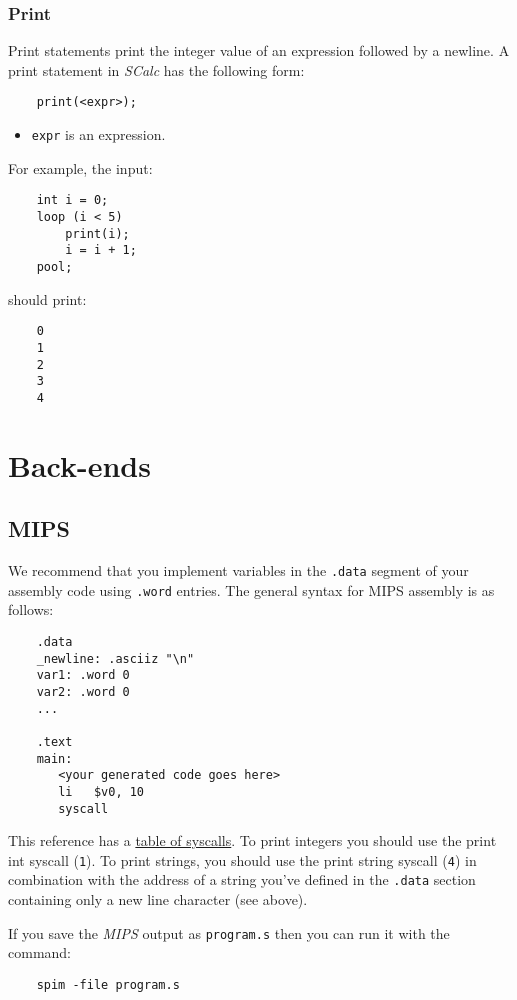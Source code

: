 \documentclass{article}
\newcommand{\code}[1]{\texttt{\textmd{#1}}}
\begin{document}
\subsubsection{Print}
\label{sssec:print}
Print statements print the integer value of an expression followed by a newline. A print statement
in \textit{SCalc} has the following form:
\begin{lstlisting}
	print(<expr>);
\end{lstlisting}

\begin{itemize}
	\item \code{expr} is an expression.
\end{itemize}

For example, the input:
\begin{lstlisting}
	int i = 0;
	loop (i < 5)
		print(i);
		i = i + 1;
	pool;
\end{lstlisting}
should print:
\begin{lstlisting}
	0
	1
	2
	3
	4
\end{lstlisting}

\section{Back-ends}
\subsection{MIPS}
We recommend that you implement variables in the \code{.data} segment of your assembly code using \code{.word} entries. The
general syntax for MIPS assembly is as follows:

\begin{lstlisting}
	.data
	_newline: .asciiz "\n"
	var1: .word 0
	var2: .word 0
	...

	.text
	main:
	   <your generated code goes here>
	   li   $v0, 10
	   syscall
\end{lstlisting}

This reference has a \href{http://students.cs.tamu.edu/tanzir/csce350/reference/syscalls.html}
{table of syscalls}. To print integers you should use the print int syscall (\code{1}). To print
strings, you should use the print string syscall (\code{4}) in combination with the address of a
string you've defined in the \code{.data} section containing only a new line character (see above).

If you save the \textit{MIPS} output as \code{program.s} then you can run it with the command:
\begin{lstlisting}
	spim -file program.s
\end{lstlisting}
\end{document}
